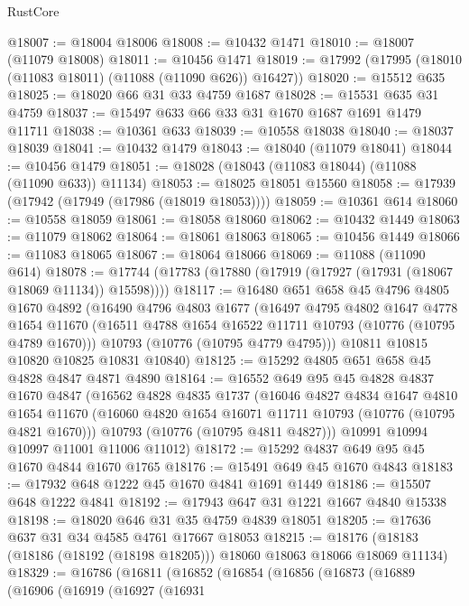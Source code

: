 \begin{lexlean}{RustCore}
\begin{coremodule}
@18007 := @18004 @18006
@18008 := @10432 @1471
@18010 := @18007 (@11079 @18008)
@18011 := @10456 @1471
@18019 := @17992 (@17995 (@18010 (@11083 @18011) (@11088 (@11090 @626)) @16427))
@18020 := @15512 @635
@18025 := @18020 @66 @31 @33 @4759 @1687
@18028 := @15531 @635 @31 @4759
@18037 := @15497 @633 @66 @33 @31 @1670 @1687 @1691 @1479 @11711
@18038 := @10361 @633
@18039 := @10558 @18038
@18040 := @18037 @18039
@18041 := @10432 @1479
@18043 := @18040 (@11079 @18041)
@18044 := @10456 @1479
@18051 := @18028 (@18043 (@11083 @18044) (@11088 (@11090 @633)) @11134)
@18053 := @18025 @18051 @15560
@18058 := @17939 (@17942 (@17949 (@17986 (@18019 @18053))))
@18059 := @10361 @614
@18060 := @10558 @18059
@18061 := @18058 @18060
@18062 := @10432 @1449
@18063 := @11079 @18062
@18064 := @18061 @18063
@18065 := @10456 @1449
@18066 := @11083 @18065
@18067 := @18064 @18066
@18069 := @11088 (@11090 @614)
@18078 := @17744 (@17783 (@17880 (@17919 (@17927 (@17931 (@18067 @18069 @11134)) @15598))))
@18117 := @16480
    @651
    @658
    @45
    @4796
    @4805
    @1670
    @4892
    (@16490
      @4796
      @4803
      @1677
      (@16497
        @4795
        @4802
        @1647
        @4778
        @1654
        @11670
        (@16511 @4788 @1654 @16522 @11711 @10793 (@10776 (@10795 @4789 @1670)))
        @10793
        (@10776 (@10795 @4779 @4795)))
      @10811
      @10815
      @10820
      @10825
      @10831
      @10840)
@18125 := @15292 @4805 @651 @658 @45 @4828 @4847 @4871 @4890
@18164 := @16552
    @649
    @95
    @45
    @4828
    @4837
    @1670
    @4847
    (@16562
      @4828
      @4835
      @1737
      (@16046
        @4827
        @4834
        @1647
        @4810
        @1654
        @11670
        (@16060 @4820 @1654 @16071 @11711 @10793 (@10776 (@10795 @4821 @1670)))
        @10793
        (@10776 (@10795 @4811 @4827)))
      @10991
      @10994
      @10997
      @11001
      @11006
      @11012)
@18172 := @15292 @4837 @649 @95 @45 @1670 @4844 @1670 @1765
@18176 := @15491 @649 @45 @1670 @4843
@18183 := @17932 @648 @1222 @45 @1670 @4841 @1691 @1449
@18186 := @15507 @648 @1222 @4841
@18192 := @17943 @647 @31 @1221 @1667 @4840 @15338
@18198 := @18020 @646 @31 @35 @4759 @4839 @18051
@18205 := @17636 @637 @31 @34 @4585 @4761 @17667 @18053
@18215 := @18176 (@18183 (@18186 (@18192 (@18198 @18205))) @18060 @18063 @18066 @18069 @11134)
@18329 := @16786
    (@16811
      (@16852
        (@16854
          (@16856
            (@16873
              (@16889
                (@16906
                  (@16919
                    (@16927
                      (@16931

\end{coremodule}
\end{lexlean}
